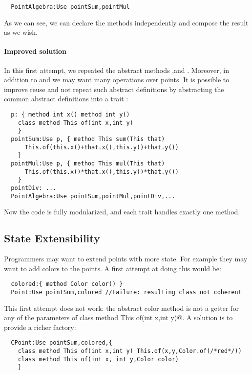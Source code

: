 \begin{lstlisting}
  PointAlgebra:Use pointSum,pointMul
\end{lstlisting}  

  As we can see, we can declare the methods independently and compose the result
  as we wish. 

  \paragraph{Improved solution} In this first attempt, we repeated the abstract methods \Q@x@,\Q@y@ and \Q@of@.
  Moreover, in addition to \Q@sum@ and \Q@mul@ we may want many
  operations over points. It is possible to improve reuse
  and not repeat such abstract definitions by abstracting the common
  abstract definitions into a trait \Q@p@: 

\begin{lstlisting}
  p: { method int x() method int y()
    class method This of(int x,int y)
    }
  pointSum:Use p, { method This sum(This that)
      This.of(this.x()+that.x(),this.y()+that.y())
    }
  pointMul:Use p, { method This mul(This that)
      This.of(this.x()*that.x(),this.y()*that.y())
    }
  pointDiv: ...
  PointAlgebra:Use pointSum,pointMul,pointDiv,...
\end{lstlisting}
      
Now the code is fully modularized, and each trait handles exactly one method.

\subsection{State Extensibility}
Programmers may want to extend points with more state. For example 
they may want to add colors to the points. A first attempt at doing
this would be:

\begin{lstlisting}
  colored:{ method Color color() }
  Point:Use pointSum,colored //Failure: resulting class not coherent
\end{lstlisting}

This first attempt does not work: the abstract color method
is not a getter for any of the parameters of 
\Q@ class method This of(int x,int y)@. 
A solution is to provide a richer factory:

\begin{lstlisting}
  CPoint:Use pointSum,colored,{
    class method This of(int x,int y) This.of(x,y,Color.of(/*red*/))
    class method This of(int x, int y,Color color)
    }
\end{lstlisting}

